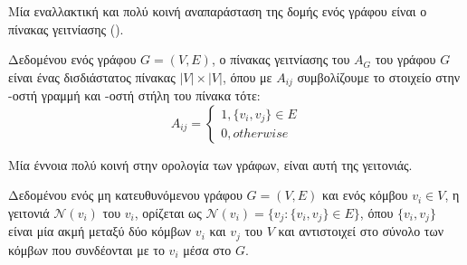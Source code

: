 Μία εναλλακτική και πολύ κοινή αναπαράσταση της δομής ενός γράφου είναι ο πίνακας γειτνίασης ().
\begin{definition}
Δεδομένου ενός γράφου $G = ( V, E )$, ο πίνακας γειτνίασης του $A_{G}$ του γράφου $G$ είναι ένας δισδιάστατος πίνακας $|V|\times |V|$, όπου με $Α_{ij}$ συμβολίζουμε το στοιχείο στην -οστή γραμμή και -οστή στήλη του πίνακα τότε:
\begin{equation}
 A_{ij} =
\begin{cases}
1, \{v_{i}, v_{j}\} \in E\\
0, otherwise
\end{cases}
\end{equation}
\label{def:adjacency_matrix}
\end{definition}

Μία έννοια πολύ κοινή στην ορολογία των γράφων, είναι αυτή της γειτονιάς.
\begin{definition}[Γειτονιά]
Δεδομένου ενός μη κατευθυνόμενου γράφου $G = ( V, E )$ και ενός κόμβου $v_{i} \in V$,
η γειτονιά $\mathcal{N}(v_{i})$ του $v_{i}$, ορίζεται ως $\mathcal{N}(v_{i}) = \{v_{j} : \{v_{i}, v_{j}\} \in E\}$, όπου $\{v_{i}, v_{j}\}$ είναι μία ακμή μεταξύ δύο κόμβων $v_{i}$ και $v_{j}$ του $V$ και αντιστοιχεί στο σύνολο των κόμβων που συνδέονται με το $v_{i}$ μέσα στο $G$.
\end{definition}

